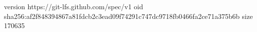 version https://git-lfs.github.com/spec/v1
oid sha256:af2f848394867a81fdcb2c3ead09f74291c747dc9718fb0466fa2ce71a375b6b
size 170635
